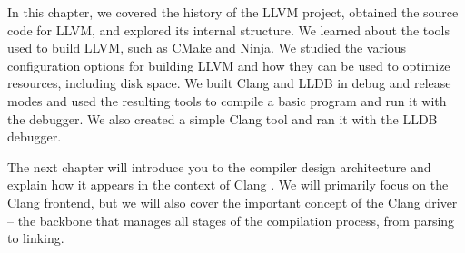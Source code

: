 In this chapter, we covered the history of the LLVM project, obtained the source code for LLVM, and explored its internal structure. We learned about the tools used to build LLVM, such as CMake and Ninja. We studied the various configuration options for building LLVM and how they can be used to optimize resources, including disk space. We built Clang and LLDB in debug and release modes and used the resulting tools to compile a basic program and run it with the debugger. We also created a simple Clang tool and ran it with the LLDB debugger.

The next chapter will introduce you to the compiler design architecture and explain how it appears in the context of Clang . We will primarily focus on the Clang frontend, but we will also cover the important concept of the Clang driver – the backbone that manages all stages of the compilation process, from parsing to linking.